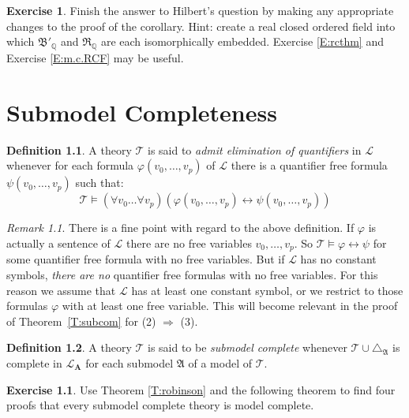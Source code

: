 \documentclass[titlepage, oneside]{amsbook}
\theoremstyle{plain}
\theoremstyle{definition}
\newtheorem{exercise}{Exercise}
\newtheorem{definition}{Definition}
\theoremstyle{remark}
\newtheorem*{rem}{Remark}
\newcommand{\theory}{\ensuremath{\mathcal{T}}}
\newcommand{\lan}{\ensuremath{\mathcal{L}}}
\newcommand{\mb}{\ensuremath{\mathfrak{B}}}
\newcommand{\mr}{\ensuremath{\mathfrak{R}}}
\begin{document}
\begin{exercise} Finish the answer to Hilbert's question by making any
appropriate changes to the proof of the corollary.  Hint: create a real closed 
ordered field into which $\mb'_{\mathbb{Q}}$ and $\mr _{\mathbb{Q}}$ are each isomorphically embedded. Exercise \ref{E:rcthm} and Exercise \ref{E:m.c.RCF} may be useful.
\end{exercise}


\chapter{ Submodel Completeness}

\begin{definition}
%
 A theory $\mathcal T$ is said to
\emph{admit elimination of quantifiers} in $ \mathcal L$ whenever for each
formula
$\varphi  (v_0 , \dots , v_p) $ of $\mathcal L$ there is a quantifier
free
formula $\psi (v_0 , \dots , v_p)$ such that: \[\mathcal T \models (
\forall v_0 \dots \forall v_p ) ( \varphi (v_0 , \dots , v_p)
\leftrightarrow \psi (v_0 , \dots, v_p)) \]

\end{definition}

\begin{rem} 
There is a fine point with regard to the above definition.  If
$\varphi$ is actually a sentence of $\lan$ there are no free variables
$v_0 , \dots , v_p$.  So $\theory \models \varphi \leftrightarrow \psi$
for some quantifier free formula with no free variables.  But if $\lan$
has no constant symbols, \emph{there are no} quantifier free formulas with
no free variables.  For this reason we assume that $\lan$ has 
at least one constant symbol, or we restrict to those formulas $\varphi$
with at least one free variable.  This will become relevant in the proof
of Theorem~\ref{T:subcom} for (2) $\Rightarrow$ (3).
\end{rem}

\begin{definition}
%
 A theory $\mathcal T$ is said to be
\emph{submodel
complete} whenever $\mathcal T \cup \triangle_{\mathfrak{A}} $ is
complete in $\mathcal{L}_{\mathbf{A}}$ for each submodel $\mathfrak A$
of a model of $\mathcal T$.
\end{definition}

\begin{exercise}\label{X:four}  Use Theorem \ref{T:robinson} and the
following theorem
to find four proofs that every submodel complete theory is model
complete.
\end{exercise}
\end{document}
